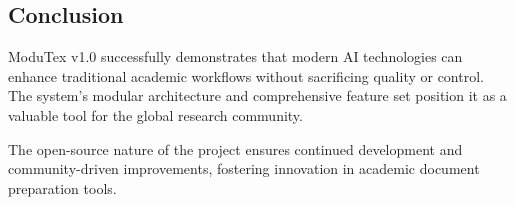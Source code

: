 \subsection{Conclusion}

ModuTex v1.0 successfully demonstrates that modern AI technologies can enhance traditional academic workflows without sacrificing quality or control. The system's modular architecture and comprehensive feature set position it as a valuable tool for the global research community.

The open-source nature of the project ensures continued development and community-driven improvements, fostering innovation in academic document preparation tools. 